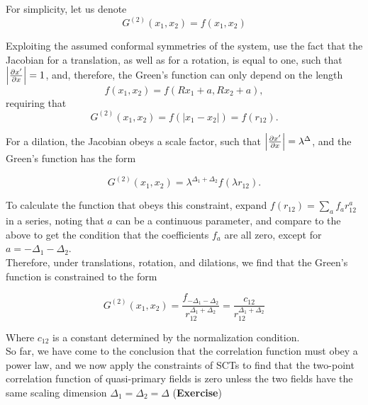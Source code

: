 For simplicity, let us denote 
\begin{equation}
	G^{(2)} (x_1, x_2) =f(x_1,x_2) 
\end{equation}

\noindent Exploiting the assumed conformal symmetries of the system, use the fact that the Jacobian for a translation, as well as for a rotation, is equal to one, such that $\Big{|} \frac{\partial x'}{\partial x} \Big{|} = 1$, and, therefore, the Green's function can only depend on the length 
\begin{equation}
	f(x_1,x_2) = f(Rx_1 + a, Rx_2 + a),
\end{equation}
requiring that
\begin{equation}
G^{(2)} (x_1, x_2) = f(|x_1 - x_2|) = f(r_{12}).
\end{equation}

\noindent For a dilation, the Jacobian obeys a scale factor, such that $\Big{|} \frac{\partial x'}{\partial x} \Big{|} = \lambda^{\Delta}$, and the Green's function has the form

\begin{equation}
G^{(2)} (x_1, x_2) = \lambda^{\Delta_1 + \Delta_2} f(\lambda r_{12}).
\end{equation}

\noindent To calculate the function that obeys this constraint, expand $f(r_{12}) = \sum_a f_a r_{12}^a$ in a series, noting that $a$ can be a continuous parameter, and compare to the above to get the condition that the coefficients $f_a$ are all zero, except for $a = -\Delta_1 - \Delta_2$. \\

\noindent Therefore, under translations, rotation, and dilations, we find that the Green's function is constrained to the form

\begin{equation}
G^{(2)} (x_1, x_2) = \frac{f_{-\Delta_1 - \Delta_2}}{r_{12}^{\Delta_1 + \Delta_2}} = \frac{c_{12}}{r_{12}^{\Delta_1 + \Delta_2}}
\end{equation}

\noindent Where $c_{12}$ is a constant determined by the normalization condition. \\

\noindent So far, we have come to the conclusion that the correlation function must obey a power law, and we now apply the constraints of SCTs to find that the two-point correlation function of quasi-primary fields is zero unless the two fields have the same scaling dimension $\Delta_1 = \Delta_2 = \Delta$ (\textbf{Exercise})

